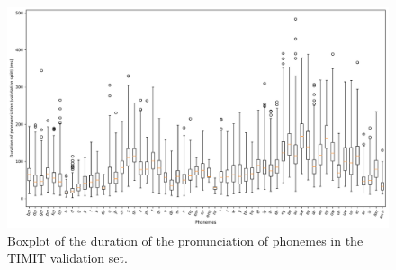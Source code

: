 \begin{figure}[t!]
    \centering
    \hfill
    \includegraphics[width=\textwidth]{gfx/TIMIT_validation_set_phoneme_duration_boxplot_speaker_id_None.pdf}
    \caption{Boxplot of the duration of the pronunciation of phonemes in the TIMIT validation set.}
    \label{fig:timit-phoneme-duration}
\end{figure}
